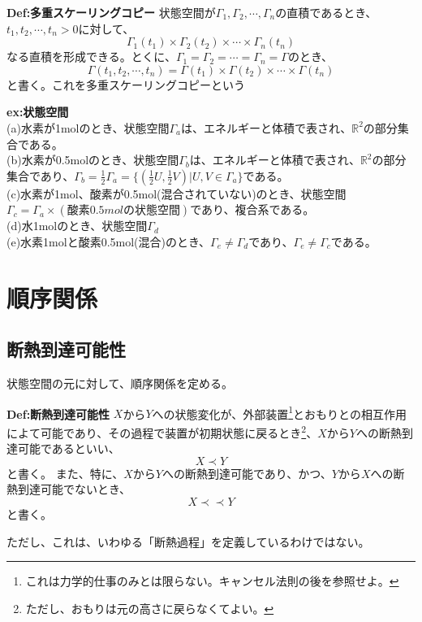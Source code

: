 \documentclass[a4paper,11pt]{jsarticle}
\numberwithin{equation}{section}
\begin{document}
\begin{itembox}[l]{\textbf{Def:多重スケーリングコピー}}
    状態空間が$\Gamma_1,\Gamma_2,\cdots,\Gamma_n$の直積であるとき、$t_1,t_2,\cdots,t_n>0$に対して、
    \begin{equation}
        \Gamma_1(t_1) \times \Gamma_2(t_2) \times \cdots \times \Gamma_n(t_n)
    \end{equation}
    なる直積を形成できる。とくに、$\Gamma_1=\Gamma_2=\cdots=\Gamma_n=\Gamma$のとき、
    \begin{equation}
        \Gamma(t_1,t_2,\cdots,t_n)=\Gamma(t_1) \times \Gamma(t_2) \times \cdots \times \Gamma(t_n)
    \end{equation}
    と書く。これを多重スケーリングコピーという
\end{itembox}

\textbf{ex:状態空間}\\
(a)水素が1molのとき、状態空間$\Gamma_a$は、エネルギーと体積で表され、$\mathbb{{R}}^2$の部分集合である。\\
(b)水素が0.5molのとき、状態空間$\Gamma_b$は、エネルギーと体積で表され、$\mathbb{{R}}^2$の部分集合であり、$\Gamma_b=\frac{1}{2}\Gamma_a=\{(\frac{1}{2}U,\frac{1}{2}V)|U,V \in \Gamma_a\}$である。\\
(c)水素が1mol、酸素が0.5mol(混合されていない)のとき、状態空間$\Gamma_c=\Gamma_a \times (酸素0.5molの状態空間)$であり、複合系である。\\
(d)水1molのとき、状態空間$\Gamma_d$\\
(e)水素1molと酸素0.5mol(混合)のとき、$\Gamma_e\neq \Gamma_d$であり、$\Gamma_e\neq \Gamma_c$である。\\

\section{順序関係}
\subsection{断熱到達可能性}
状態空間の元に対して、順序関係を定める。
\begin{itembox}[l]{\textbf{Def:断熱到達可能性}}
    $X$から$Y$への状態変化が、外部装置\footnote{これは力学的仕事のみとは限らない。キャンセル法則の後を参照せよ。}とおもりとの相互作用によて可能であり、その過程で装置が初期状態に戻るとき\footnote{ただし、おもりは元の高さに戻らなくてよい。}、$X$から$Y$への断熱到達可能であるといい、
    \begin{equation}
        X \prec Y
    \end{equation}
    と書く。
    また、特に、$X$から$Y$への断熱到達可能であり、かつ、$Y$から$X$への断熱到達可能でないとき、
    \begin{equation}
        X \prec \prec Y
    \end{equation}
    と書く。
\end{itembox}
ただし、これは、いわゆる「断熱過程」を定義しているわけではない。\\
\end{document}
